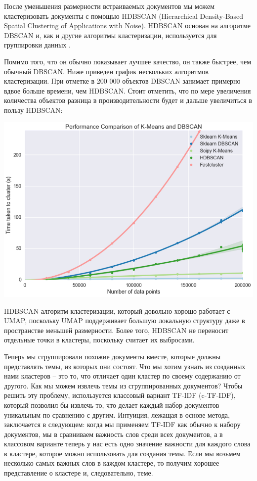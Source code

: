 После уменьшения размерности встраиваемых документов  мы можем кластеризовать документы с помощью HDBSCAN (Hierarchical Density-Based Spatial Clustering of Applications with Noise).
HDBSCAN основан на алгоритме DBSCAN и, как и другие алгоритмы кластеризации, используется для группировки данных \cite{bib_3}.

Помимо того, что он обычно показывает лучшее качество, он также быстрее, чем обычный DBSCAN. Ниже приведен график нескольких алгоритмов кластеризации. При отметке в 200 000 объектов DBSCAN занимает примерно вдвое больше времени, чем HDBSCAN. Стоит отметить, что по мере увеличения количества объектов разница в производительности будет и дальше увеличиться в пользу HDBSCAN:
\newline

\includegraphics[scale=0.5]{pics/clustering-comparison.png}



HDBSCAN алгоритм кластеризации, который довольно хорошо работает с UMAP, поскольку UMAP поддерживает большую локальную структуру даже в пространстве меньшей размерности. Более того, HDBSCAN не переносит отдельные точки в кластеры, поскольку считает их выбросами.


Теперь мы сгруппировали похожие документы вместе, которые должны представлять темы, из которых они состоят. Что мы хотим узнать из созданных нами кластеров -- это то, что отличает один кластер по своему содержанию от другого.  Как мы можем извлечь темы из сгруппированных документов? Чтобы решить эту проблему, используется классовый вариант TF-IDF (c-TF-IDF), который позволил бы извлечь то, что делает каждый набор документов уникальным по сравнению с другим. Интуиция, лежащая в основе метода, заключается в следующем: когда мы применяем TF-IDF как обычно к набору документов, мы в сравниваем важность слов среди всех документов, а в классовом варианте теперь у нас есть одно значение важности для каждого слова в кластере, которое можно использовать для создания темы. Если мы возьмем несколько  самых важных слов в каждом кластере, то получим хорошее представление о кластере и, следовательно, теме.

